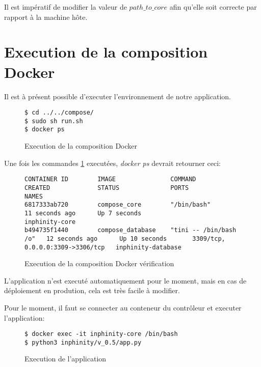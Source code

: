 Il est impératif de modifier la valeur de \emph{$path\_to\_core$} afin qu’elle soit correcte par rapport à la machine hôte.

\section{Execution de la composition Docker}

Il est à présent possible d'executer l'environnement de notre application.

\begin{figure}[H] 
\centering 
\begin{lstlisting}[frame=single]
$ cd ../../compose/
$ sudo sh run.sh
$ docker ps
\end{lstlisting} 
\caption[Code - Execution composition]{Execution de la composition Docker}
\label{fig:execCompose} 
\end{figure}

Une fois les commandes \ref{fig:execCompose} executées, \emph{docker ps} devrait retourner ceci:

\begin{figure}[H] 
\centering 
\begin{lstlisting}[frame=single]
CONTAINER ID        IMAGE               COMMAND                  CREATED             STATUS              PORTS                              NAMES
6817333ab720        compose_core        "/bin/bash"              11 seconds ago      Up 7 seconds                                           inphinity-core
b494735f1440        compose_database    "tini -- /bin/bash /o"   12 seconds ago      Up 10 seconds       3309/tcp, 0.0.0.0:3309->3306/tcp   inphinity-database
\end{lstlisting} 
\caption[Code - Execution composition vérification]{Execution de la composition Docker vérification}
\label{fig:execComposeCheck} 
\end{figure}

L'application n'est executé automatiquement pour le moment, mais en cas de déploiement en prodution, cela est très facile à modifier.

Pour le moment, il faut se connecter au conteneur du contrôleur et executer l'application:

\begin{figure}[H] 
\centering 
\begin{lstlisting}[frame=single]
$ docker exec -it inphinity-core /bin/bash
$ python3 inphinity/v_0.5/app.py 
\end{lstlisting} 
\caption[Code - Execution Application]{Execution de l'application}
\label{fig:execComposeCheck} 
\end{figure}



















